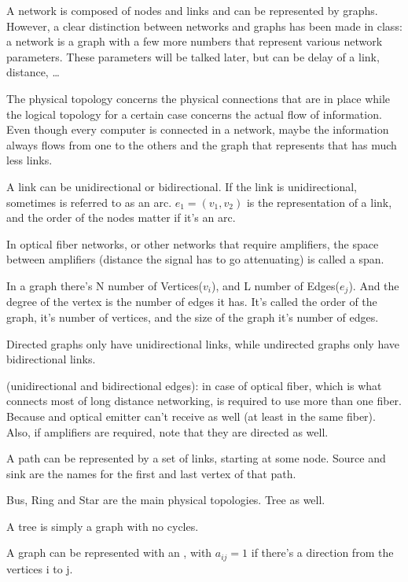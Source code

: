 A network is composed of nodes and links and can be represented by graphs.
However, a clear distinction between networks and graphs has been made in class: a network is a graph with a few more numbers that represent various network parameters. These parameters will be talked later, but can be delay of a link, distance, \dots


The physical topology concerns the physical connections that are in place while the logical topology for a certain case concerns the actual flow of information. Even though every computer is connected in a network, maybe the information always flows from one to the others and the graph that represents that has much less links.


A link can be unidirectional or bidirectional. If the link is unidirectional, sometimes is referred to as an arc. $e_1 = (v_1,v_2)$ is the representation of a link, and the order of the nodes matter if it's an arc.

In optical fiber networks, or other networks that require amplifiers, the space between amplifiers (distance the signal has to go attenuating) is called a span.



In a graph there's N number of Vertices($v_i$), and L number of Edges($e_j$). And the degree of the vertex is the number of edges it has.
It's called the order of the graph, it's number of vertices, and the size of the graph it's number of edges.

Directed graphs only have unidirectional links, while undirected graphs only have bidirectional links.

(unidirectional and bidirectional edges): in case of optical fiber, which is what connects most of long distance networking, is required to use more than one fiber. Because and optical emitter can't receive as well (at least in the same fiber). 
Also, if amplifiers are required, note that they are directed as well.

A path can be represented by a set of links, starting at some node. Source and sink are the names for the first and last vertex of that path.




Bus, Ring and Star are the main physical topologies. Tree as well.

A tree is simply a graph with no cycles.


A graph can be represented with an , with $a_{ij} = 1$ if there's a direction from the vertices i to j.

